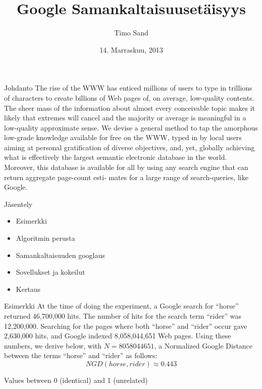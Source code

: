 \documentclass{beamer}
\title[Google Similarity Distance]{Google Samankaltaisuusetäisyys}
\author[T. Sand]{Timo Sand}
\institute[UH]{
  Tietojenkäsittelytieteen laitos\\
  Helsingin Yliopisto\\
  Helsinki\\[1ex]
}
\date[November 2013]{14. Marraskuu, 2013}
\begin{document}
\begin{frame}[plain]
  \titlepage
\end{frame}

\begin{frame}{Johdanto}
  The rise of the WWW has enticed millions of users to type in trillions of characters to create billions of Web pages of, on average, low-quality contents. The sheer mass of the information about almost every conceivable topic makes it likely that extremes will cancel and the majority or average is meaningful in a low-quality approximate sense. We devise a general method to tap the amorphous low-grade knowledge available for free on the WWW, typed in by local users aiming at personal gratification of diverse objectives, and, yet, globally achieving what is effectively the largest semantic electronic database in the world. Moreover, this database is available for all by using any search engine that can return aggregate page-count esti- mates for a large range of search-queries, like Google.
\end{frame}

\begin{frame}{Jäsentely}

\begin{itemize}
  \item Esimerkki
  \pause
  \item Algoritmin perusta
  \pause
  \item Samankaltaisuuden googlaus
  \pause
  \item Sovellukset ja kokeilut
  \pause
  \item Kertaus
\end{itemize}

\end{frame}

\begin{frame}{Esimerkki}
  At the time of doing the experiment, a Google search for “horse” returned 46,700,000 hits. The number of hits for the search term “rider” was 12,200,000. Searching for the pages where both “horse” and “rider” occur gave 2,630,000 hits, and Google indexed 8,058,044,651 Web pages. Using these numbers, we derive below, with $N = 8 058 044 651$, a Normalized Google Distance between the terms “horse” and “rider” as follows:
  \[
    NGD(horse, rider) \approx 0.443
  \]

    Values between 0 (identical) and 1 (unrelated)
\end{frame}
\end{document}
